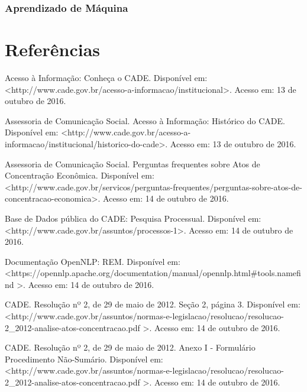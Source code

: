 \documentclass[11pt]{report}
\begin{document}
\subsection{Aprendizado de Máquina}

\pagebreak
\chapter*{Referências}

\begin{enumerate}[label={[\arabic*]}]
\item Acesso à Informação: Conheça o CADE. Disponível em: \textless\enspace http://www.cade.gov.br/acesso-a-informacao/institucional\enspace\textgreater. Acesso em: 13 de outubro de 2016.
\item Assessoria de Comunicação Social. Acesso à Informação: Histórico do CADE. Disponível em: \textless\enspace http://www.cade.gov.br/acesso-a-informacao/institucional/historico-do-cade\enspace\textgreater. Acesso em: 13 de outubro de 2016.
\item Assessoria de Comunicação Social. Perguntas frequentes sobre Atos de Concentração Econômica. Disponível em: \textless\enspace http://www.cade.gov.br/servicos/perguntas-frequentes/perguntas-sobre-atos-de-concentracao-economica\enspace\textgreater. Acesso em: 14 de outubro de 2016.
\item Base de Dados pública do CADE: Pesquisa Processual. Disponível em: \newline\textless\enspace http://www.cade.gov.br/assuntos/processos-1\enspace\textgreater. Acesso em: 14 de outubro de 2016.
\item Documentação OpenNLP: REM. Disponível em: \newline\textless\enspace https://opennlp.apache.org/documentation/manual/opennlp.html\#tools.namefind \enspace\textgreater. Acesso em: 14 de outubro de 2016.
\item CADE. Resolução nº 2, de 29 de maio de 2012. Seção 2, página 3. Disponível em: \textless\enspace http://www.cade.gov.br/assuntos/normas-e-legislacao/resolucao/resolucao-2\_2012-analise-atos-concentracao.pdf \enspace\textgreater. Acesso em: 14 de outubro de 2016.
\item CADE. Resolução nº 2, de 29 de maio de 2012. Anexo I - Formulário Procedimento Não-Sumário. Disponível em: \newline\textless\enspace http://www.cade.gov.br/assuntos/normas-e-legislacao/resolucao/resolucao-2\_2012-analise-atos-concentracao.pdf \enspace\textgreater. Acesso em: 14 de outubro de 2016.

\end{enumerate}
\end{document}

